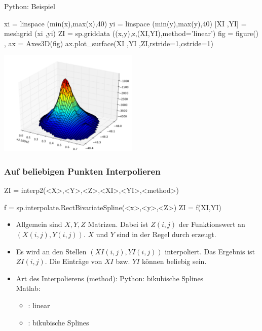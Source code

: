 \documentclass[hyperref={xetex}]{beamer}
\begin{document}
\begin{frame}[fragile]{Python: Beispiel}
\begin{pyin}
xi = linspace (min(x),max(x),40)
yi = linspace (min(y),max(y),40)
[XI ,YI] = meshgrid (xi ,yi)
ZI = sp.griddata ((x,y),z,(XI,YI),method='linear')
fig = figure() , ax = Axes3D(fig)
ax.plot_surface(XI ,YI ,ZI,rstride=1,cstride=1) 
\end{pyin}
\begin{center}
\includegraphics[width=0.5\textwidth]{figures/scattered_data_plot_py}
\end{center}
\end{frame}
%
% 
\begin{frame}[fragile]\frametitle{Auf beliebigen Punkten Interpolieren}
\begin{matlabin}
ZI = interp2(<X>,<Y>,<Z>,<XI>,<YI>,<method>)
\end{matlabin}
\begin{pyin}
f = sp.interpolate.RectBivariateSpline(<x>,<y>,<Z>)
ZI = f(XI,YI)
\end{pyin}
\begin{itemize}
\item Allgemein sind $X,Y,Z$ Matrizen. Dabei ist $Z(i,j)$ der Funktionswert an
  $(X(i,j),Y(i,j))$. $X$ und $Y$ sind in der Regel durch  erzeugt. 
\item Es wird an den Stellen $(XI(i,j),YI(i,j))$ interpoliert. Das Ergebnis
  ist $ZI(i,j)$. Die Einträge von $XI$ bzw. $YI$ k\"onnen beliebig sein. 
\item Art des Interpolierens (method):
Python: bikubische Splines\\
Matlab:
\begin{itemize}
 \item {}: linear
 \item {}: bikubische Splines
\end{itemize}
\end{itemize}
\end{frame}
\end{document}

